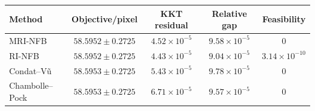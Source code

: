 \begin{tabular}{lcccc}\hline
Method & Objective/pixel & KKT residual & Relative gap & Feasibility \\
\hline
MRI-NFB & $58.5952 \pm 0.2725$ & $4.52\times10^{-5}$ & $9.58\times10^{-5}$ & $0$ \\
RI-NFB & $58.5952 \pm 0.2725$ & $4.43\times10^{-5}$ & $9.04\times10^{-5}$ & $3.14\times10^{-10}$ \\
Condat--V{\~u} & $58.5953 \pm 0.2725$ & $5.43\times10^{-5}$ & $9.78\times10^{-5}$ & $0$ \\
Chambolle--Pock & $58.5953 \pm 0.2725$ & $6.71\times10^{-5}$ & $9.57\times10^{-5}$ & $0$ \\
\hline\end{tabular}
